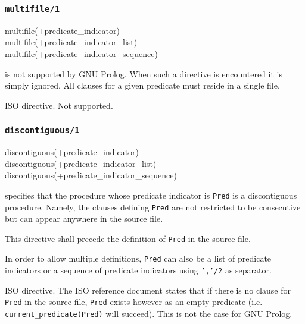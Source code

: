 \subsubsection{\texttt{multifile/1}}

\begin{TemplatesOneCol}
multifile(+predicate\_indicator)\\
multifile(+predicate\_indicator\_list)\\
multifile(+predicate\_indicator\_sequence)

\end{TemplatesOneCol}

\Description

 is not supported by GNU Prolog.
When such a directive is encountered it is simply ignored. All clauses for a
given predicate must reside in a single file.

\Portability

ISO directive. Not supported.

\subsubsection{\texttt{discontiguous/1}}

\begin{TemplatesOneCol}
discontiguous(+predicate\_indicator)\\
discontiguous(+predicate\_indicator\_list)\\
discontiguous(+predicate\_indicator\_sequence)

\end{TemplatesOneCol}

\Description

 specifies that the procedure whose predicate
indicator is \texttt{Pred} is a discontiguous procedure. Namely, the clauses
defining \texttt{Pred} are not restricted to be consecutive but can appear
anywhere in the source file.

This directive shall precede the definition of \texttt{Pred} in the source
file.

In order to allow multiple definitions, \texttt{Pred} can also be a list of
predicate indicators or a sequence of predicate indicators using
\texttt{','/2} as separator.

\Portability

ISO directive. The ISO reference document states that if there is no clause
for \texttt{Pred} in the source file, \texttt{Pred} exists however as an
empty predicate (i.e. \texttt{current\_predicate(Pred)} will succeed). This
is not the case for GNU Prolog.


